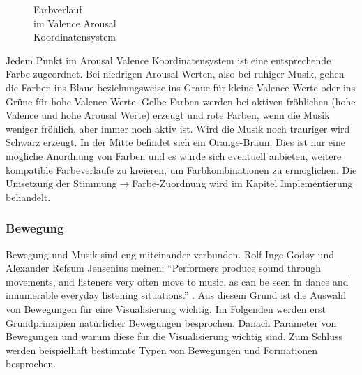 \documentclass[11pt,a4paper]{article}
\begin{document}
\begin{wrapfigure}{l}{0.5\linewidth}
\captionsetup{justification=centering}
\caption[Farbverlauf im Valence Arousal Koordinatensystem]{Farbverlauf\\im Valence Arousal\\Koordinatensystem}
\end{wrapfigure}
\noindent
Jedem Punkt im Arousal Valence Koordinatensystem ist eine entsprechende Farbe zugeordnet. Bei niedrigen Arousal Werten, also bei ruhiger Musik, gehen die Farben ins Blaue beziehungsweise ins Graue für kleine Valence Werte oder ins Grüne für hohe Valence Werte. Gelbe Farben werden bei aktiven fröhlichen (hohe Valence und hohe Arousal Werte) erzeugt und rote Farben, wenn die Musik weniger fröhlich, aber immer noch aktiv ist. Wird die Musik noch trauriger wird Schwarz erzeugt. In der Mitte befindet sich ein Orange-Braun. Dies ist nur eine mögliche Anordnung von Farben und es würde sich eventuell anbieten, weitere kompatible Farbeverläufe zu kreieren, um Farbkombinationen zu ermöglichen. Die Umsetzung der Stimmung$ \rightarrow $Farbe-Zuordnung wird im Kapitel Implementierung behandelt.

\subsubsection{Bewegung}
Bewegung und Musik sind eng miteinander verbunden. Rolf Inge God{\o}y und Alexander Refsum Jensenius meinen: ``Performers produce sound through movements, and listeners very often move to music, as can be seen in dance and innumerable everyday listening situations.'' \cite[S. 1]{905eee055abaf2a4f198ce11f35362a8963f61d552297a02dfc8fbc0c4f78679}. Aus diesem Grund ist die Auswahl von Bewegungen für eine Visualisierung wichtig. Im Folgenden werden erst Grundprinzipien natürlicher Bewegungen besprochen. Danach Parameter von Bewegungen und warum diese für die Visualisierung wichtig sind. Zum Schluss werden beispielhaft bestimmte Typen von Bewegungen und Formationen besprochen.
\end{document}
